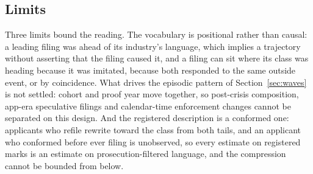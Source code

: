 \subsection{Limits}\label{sec:limits}

Three limits bound the reading. The vocabulary is positional rather than
causal: a leading filing was ahead of its industry's language, which
implies a trajectory without asserting that the filing caused it, and a
filing can sit where its class was heading because it was imitated,
because both responded to the same outside event, or by coincidence. What
drives the episodic pattern of Section~\ref{sec:waves} is not settled:
cohort and proof year move together, so post-crisis composition,
app-era speculative filings and calendar-time enforcement changes cannot
be separated on this design. And the registered description is a
conformed one: applicants who refile rewrite toward the class from both
tails, and an applicant who conformed before ever filing is unobserved,
so every estimate on registered marks is an estimate on
prosecution-filtered language, and the compression cannot be bounded
from below.
